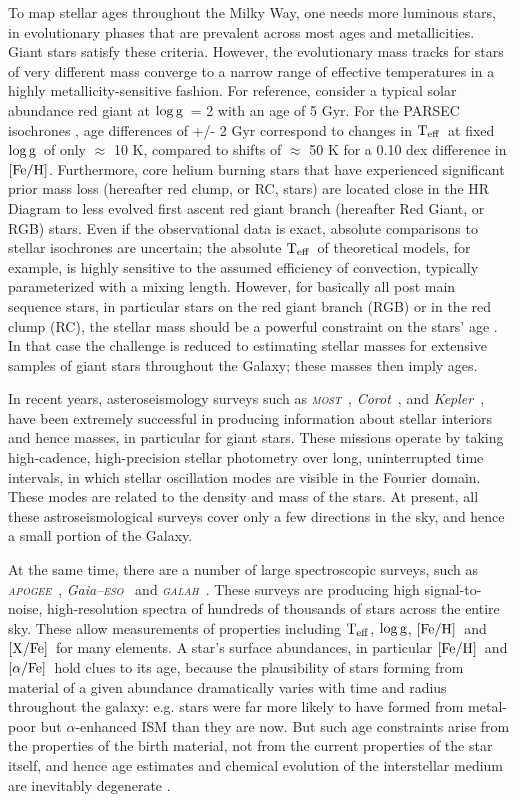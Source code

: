 \documentclass[12pt, preprint]{aastex}
\newcommand{\project}[1]{\textsl{#1}}
\newcommand{\apogee}{\project{\textsc{apogee}}}
\newcommand{\corot}{\project{Corot}}
\newcommand{\kepler}{\project{Kepler}}
\newcommand{\gaiaeso}{\project{Gaia--\textsc{eso}}}
\newcommand{\galah}{\project{\textsc{galah}}}
\newcommand{\most}{\project{\textsc{most}}}
\newcommand{\teff}{\mbox{$\rm T_{eff}$}}
\newcommand{\feh}{\mbox{$\rm [Fe/H]$}}
\newcommand{\xfe}{\mbox{$\rm [X/Fe]$}}
\newcommand{\alphafe}{\mbox{$\rm [\alpha/Fe]$}}
\newcommand{\logg}{\mbox{$\rm \log g$}}
\begin{document}
To map stellar ages throughout the Milky Way, one needs more luminous stars, in evolutionary phases that are prevalent across most ages and metallicities. Giant stars satisfy these criteria. However, the evolutionary mass tracks for stars of very different mass converge to a narrow range of effective temperatures in a highly metallicity-sensitive fashion.  For reference, consider a typical solar abundance red giant at \logg\ = 2 with an age of 5 Gyr.  For the PARSEC isochrones   \citep{Bressan2012}, age differences of +/- 2 Gyr correspond to changes in \teff\ at fixed \logg\ of only $\approx$ 10 K, compared to shifts of $\approx$ 50 K for a 0.10 dex difference in \feh.  Furthermore, core helium burning stars that have experienced significant prior mass loss (hereafter red clump, or RC, stars) are located close in the HR Diagram to less evolved first ascent red giant branch (hereafter Red Giant, or RGB) stars.  Even if the observational data is exact, absolute comparisons to stellar isochrones are uncertain; the absolute \teff\ of theoretical models, for example, is highly sensitive to the assumed efficiency of convection, typically parameterized with a mixing length.  However, for basically all post main sequence stars, in particular stars on the red giant branch (RGB) or in the red clump (RC), the stellar mass should be a powerful constraint on the stars' age \citep[see e.g.][]{Martig2014}. In that case the challenge is reduced to estimating stellar masses for extensive samples of giant stars throughout the Galaxy; these masses then imply ages.


In recent years, asteroseismology surveys such as \most\ \citep{most2005}, \corot\ \citep{corot2009}, and \kepler\ \citep{Bedding2010}, have
been extremely successful in producing information
about stellar interiors and hence masses, in particular for giant stars. 
These missions operate by taking high-cadence, high-precision stellar
photometry over long, uninterrupted time intervals, in which stellar oscillation 
modes are visible in the Fourier domain. These modes are related to the density and mass of the stars.
At present, all these astroseismological surveys cover only a few directions in the sky, and hence a small portion of the Galaxy.

At the same time, there are a number of large spectroscopic surveys, such
as \apogee\ \citep{Majewski2012}, \gaiaeso\ \citep{Gilmore2012} and \galah\ \citep{Freeman2012}. These surveys are 
producing high signal-to-noise, high-resolution spectra
of hundreds of thousands of stars across the entire sky. These allow measurements of properties including \teff, \logg, \feh\ and \xfe\ for many elements. A star's surface abundances, in particular \feh\ and \alphafe\ hold clues to its age, because the plausibility of stars forming from material of a given abundance dramatically varies with time and radius throughout the galaxy: e.g. stars 
were far more likely to have formed from metal-poor but $\alpha$-enhanced ISM than they are now. But such age constraints arise from the properties of the birth material, not from the current properties of the star itself, and hence age estimates and chemical evolution of the interstellar medium are inevitably degenerate \citep[see e.g.,][]{Schonrich2009, Ch2002}.
\end{document}
